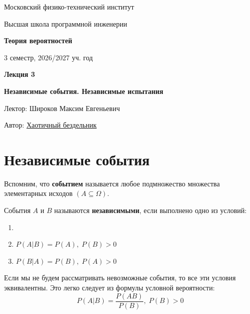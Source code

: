 \documentclass[11pt]{article}
\newcommand{\lectureNumber}{3}
\newcommand{\lectureTitle}{Независимые события. Независимые испытания}
\newcommand{\courseName}{Теория вероятностей}
\newcommand{\semester}{3 семестр, 2026/2027 уч. год}
\begin{document}
\begin{titlepage}
    \centering
    
    {\large Московский физико-технический институт \par}
    {\large Высшая школа программной инженерии \par}
    \vspace{2cm}

    {\Large \textbf{\courseName} \par}
    {\large \semester \par}
    
    \vspace*{\fill}

    {\Huge \textbf{Лекция \lectureNumber} \par}
    {\Huge \textbf{\lectureTitle} \par}
    
    \vspace*{\fill}
    
    {\large Лектор: Широков Максим Евгеньевич \par}
    {\large Автор: \href{https://t.me/ceagest}{Хаотичный бездельник} \par}

\end{titlepage}


\section{Независимые события}

\begin{remark}
    Вспомним, что \textbf{событием} называется любое подмножество множества элементарных исходов $(A \subseteq \Omega)$.
\end{remark}

\begin{definition}
    События $A$ и $B$ называются \textbf{независимыми}, если выполнено одно из условий:
    \begin{enumerate}
        \item {}
        \item $P(A | B) = P(A), \; P(B) > 0$
        \item $P(B | A) = P(B), \; P(A) > 0$
    \end{enumerate}
\end{definition}

\begin{remark}
    Если мы не будем рассматривать невозможные события, то все эти условия эквивалентны. Это легко следует из формулы условной вероятности:
    \[P(A | B) = \frac{P(AB)}{P(B)}, \; P(B) > 0\]
\end{remark}
\end{document}
